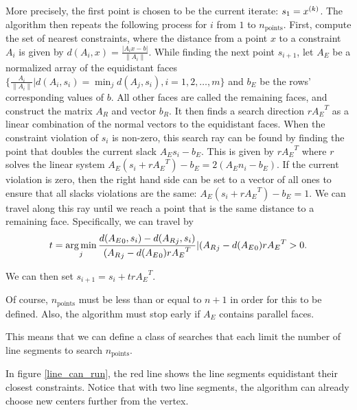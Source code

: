 More precisely, the first point is chosen to be the current iterate: $s_1 = {x}^{(k)}$.
The algorithm then repeats the following process for $i$ from $1$ to $n_{\text{points}}$.
First, compute the set of nearest constraints, where the distance from a point $x$ to a constraint $A_i$ is given by $d(A_i, x) = \frac {|A_i x - b|}{\|A_i\|}$.
While finding the next point $s_{i+1}$, let  $A_E$ be a normalized array of the equidistant faces $\{\frac{A_i}{\|A_i\|} | d(A_i, s_i) = \min_j d(A_j, s_i), i = 1, 2, \ldots, m\}$ and $b_E$ be the rows' corresponding values of $b$.
All other faces are called the remaining faces, and construct the matrix $A_R$ and vector $b_R$.
It then finds a search direction $r{A_E}^T$ as a linear combination of the normal vectors to the equidistant faces.
When the constraint violation of $s_i$ is non-zero, this search ray can be found by finding the point that doubles the current slack ${A_E}s_i-{b_E}$.
This is given by $r{A_E}^T$ where $r$ solves the linear system ${A_E}(s_i + r{A_E}^T) - b_E = 2 ({A_E}n_i - b_E)$.
If the current violation is zero, then the right hand side can be set to a vector of all ones to ensure that all slacks violations are the same: $A_E(s_i + r{A_E}^T) - b_E = 1$.
We can travel along this ray until we reach a point that is the same distance to a remaining face.
Specifically, we can travel by 
\begin{align}
t = \operatorname*{arg\,min}_j {\frac{d({A_E}_0, s_i) - d({A_R}_j, s_i)}{ ({A_R}_j - d({A_E}_0) r{A_E}^T} | ({A_R}_j - d({A_E}_0) r{A_E}^T > 0 }. 
\end{align}

We can then set $s_{i+1} = s_{i} + tr{A_E}^T$.

Of course, $n_{\text{points}}$ must be less than or equal to $n + 1$ in order for this to be defined.
Also, the algorithm must stop early if $A_E$ contains parallel faces.



This means that we can define a class of searches that each limit the number of line segments to search $n_{\text{points}}$.

In figure \cref{line_can_run}, the red line shows the line segments equidistant their closest constraints.
Notice that with two line segments, the algorithm can already choose new centers further from the vertex.

